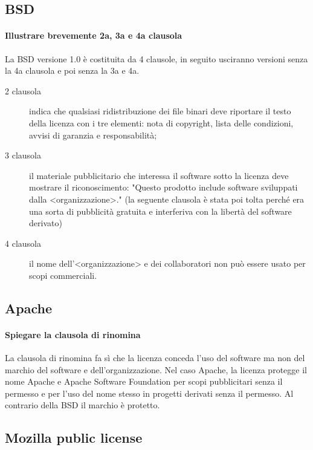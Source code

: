 \documentclass[a4paper]{article}
\begin{document}
		\subsection{BSD}
		
			\paragraph{Illustrare brevemente 2a, 3a e 4a clausola}
				La BSD versione 1.0 è costituita da 4 clausole, in seguito usciranno versioni senza la 4a clausola e poi senza la 3a e 4a.
				\begin{description}
					\item[2 clausola] indica che qualsiasi ridistribuzione dei file binari deve riportare il testo della licenza con i tre elementi: nota di copyright, lista delle condizioni, avvisi di garanzia e responsabilità;
					\item[3 clausola] il materiale pubblicitario che interessa il software sotto la licenza deve mostrare il riconoscimento:  "Questo prodotto include software sviluppati dalla <organizzazione>." (la seguente clausola è stata poi tolta perché era una sorta di pubblicità gratuita e interferiva con la libertà del software derivato)
					\item[4 clausola] il nome dell'<organizzazione> e dei collaboratori non può essere usato per scopi commerciali.
				\end{description}
			
		\subsection{Apache}
		
			\paragraph{Spiegare la clausola di rinomina}
				La clausola di rinomina fa sì che la licenza conceda l'uso del software ma non del marchio del software e dell'organizzazione.
				Nel caso Apache, la licenza protegge il nome Apache e Apache Software Foundation per scopi pubblicitari senza il permesso e per l'uso del nome stesso in progetti derivati senza il permesso. Al contrario della BSD il marchio è protetto.
			
	
		\subsection{Mozilla public license}
		
\end{document}
